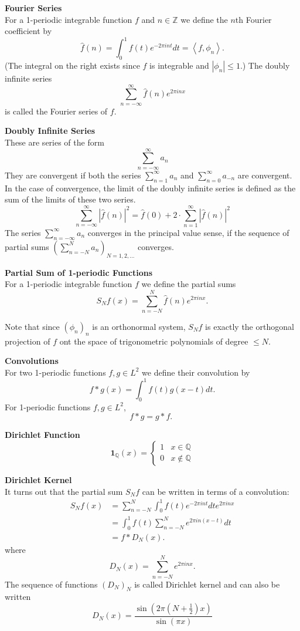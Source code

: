 \documentclass[a4paper, 10pt]{article}
\begin{document}
\begin{multicols*}{3}
\textbf{Fourier Series}\\
For a 1-periodic integrable function $f$ and $n \in \mathbb{Z}$ we define the $n$th Fourier coefficient by
$$
\widehat{f}(n)=\int_0^1 f(t) e^{-2 \pi i n t} d t=\left\langle f, \phi_n\right\rangle .
$$
(The integral on the right exists since $f$ is integrable and $\left|\phi_n\right| \leq 1$.) The doubly infinite series
$$
\sum_{n=-\infty}^{\infty} \widehat{f}(n) e^{2 \pi i n x}
$$
is called the Fourier series of $f$.

\textbf{Doubly Infinite Series}\\
These are series of the form
$$
\sum_{n=-\infty}^{\infty} a_n
$$
They are convergent if both the series $\sum_{n=1}^{\infty} a_n$ and $\sum_{n=0}^{\infty} a_{-n}$ are convergent. In the case of convergence, the limit of the doubly infinite series is defined as the sum of the limits of these two series.\\
$$\sum_{n=-\infty}^{\infty}|\hat{f}(n)|^2=\hat{f}(0)+2 \cdot \sum_{n=1}^{\infty}|\hat{f}(n)|^2$$
The series $\sum_{n=-\infty}^{\infty} a_n$ converges in the principal value sense, if the sequence of partial sums $\left(\sum_{n=-N}^N a_n\right)_{N=1,2, \ldots}$ converges.

\textbf{Partial Sum of 1-periodic Functions}\\
For a 1-periodic integrable function $f$ we define the partial sums
$$
S_N f(x)=\sum_{n=-N}^N \widehat{f}(n) e^{2 \pi i n x} .
$$

Note that since $\left(\phi_n\right)_n$ is an orthonormal system, $S_N f$ is exactly the orthogonal projection of $f$ ont the space of trigonometric polynomials of degree $\leq N$. 

\textbf{Convolutions}\\
For two 1-periodic functions $f, g \in L^2$ we define their convolution by
$$
f * g(x)=\int_0^1 f(t) g(x-t) d t .
$$
For 1-periodic functions $f, g \in L^2$,
$$
f * g=g * f \text {. }
$$

\textbf{Dirichlet Function}\\
$$\mathbf{1}_{\mathbb{Q}}(x)= \begin{cases}1 & x \in \mathbb{Q} \\ 0 & x \notin \mathbb{Q}\end{cases}$$

\textbf{Dirichlet Kernel}\\
It turns out that the partial sum $S_N f$ can be written in terms of a convolution:
\begin{align*}
S_N f(x) &= \sum_{n=-N}^N \int_0^1 f(t) e^{-2 \pi i n t} d t e^{2 \pi i n x} \\
&= \int_0^1 f(t) \sum_{n=-N}^N e^{2 \pi i n(x-t)} d t \\
&= f * D_N(x) .
\end{align*}
where
$$
D_N(x)=\sum_{n=-N}^N e^{2 \pi i n x} .
$$
The sequence of functions $\left(D_N\right)_N$ is called Dirichlet kernel and can also be written
$$
D_N(x)=\frac{\sin \left(2 \pi\left(N+\frac{1}{2}\right) x\right)}{\sin (\pi x)}
$$


\end{multicols*}
\end{document}
